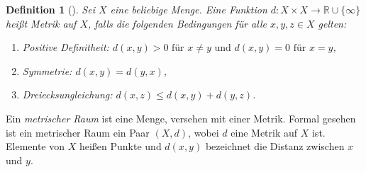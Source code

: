 \documentclass[11pt,a4paper]{article}
\def\emph#1{\textit{#1}}
\newtheorem{definition}[theorem]{Definition}
\numberwithin{equation}{section}
\begin{document}

	
	\begin{definition}[\cite{burago2001course}]
		Sei $X$ eine beliebige Menge. Eine Funktion $d:X \times X \to \mathbb{R} \cup \lbrace \infty \rbrace$ heißt \emph{Metrik} auf $X$, falls die folgenden Bedingungen für alle $x,y,z \in X$ gelten:
		\begin{enumerate}[label={(\arabic*)}]
			\item Positive Definitheit: $d(x,y) > 0 \text{ für } x \neq y \text{ und } d(x,y)=0 \text{ für } x=y$,
			\item Symmetrie: $d(x,y)=d(y,x)$,
			\item Dreiecksungleichung: $d(x,z) \leq d(x,y) + d(y,z)$.	
		\end{enumerate}
	\end{definition}
	Ein \emph{metrischer Raum} ist eine Menge, versehen mit einer Metrik. Formal gesehen ist ein metrischer Raum ein Paar $(X,d)$, wobei $d$ eine Metrik auf $X$ ist. Elemente von $X$ heißen Punkte und $d(x,y)$ bezeichnet die Distanz zwischen $x$ und $y$.
	
\end{document}
